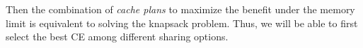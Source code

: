 Then the combination of \emph{cache plans} to maximize the benefit under the memory limit is equivalent to solving the knapsack problem. Thus, we will be able to first select the best CE among different sharing options.
